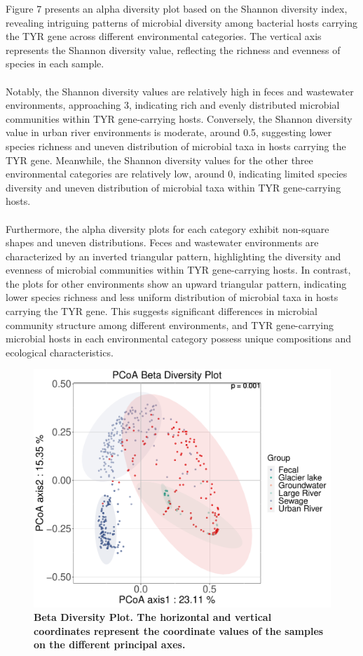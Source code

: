 \documentclass[12pt]{article}
\begin{document}
Figure 7 presents an alpha diversity plot based on the Shannon diversity index, revealing intriguing patterns of microbial diversity among bacterial hosts carrying the TYR gene across different environmental categories. The vertical axis represents the Shannon diversity value, reflecting the richness and evenness of species in each sample.\\\\
Notably, the Shannon diversity values are relatively high in feces and wastewater environments, approaching 3, indicating rich and evenly distributed microbial communities within TYR gene-carrying hosts. Conversely, the Shannon diversity value in urban river environments is moderate, around 0.5, suggesting lower species richness and uneven distribution of microbial taxa in hosts carrying the TYR gene. Meanwhile, the Shannon diversity values for the other three environmental categories are relatively low, around 0, indicating limited species diversity and uneven distribution of microbial taxa within TYR gene-carrying hosts.\\\\
Furthermore, the alpha diversity plots for each category exhibit non-square shapes and uneven distributions. Feces and wastewater environments are characterized by an inverted triangular pattern, highlighting the diversity and evenness of microbial communities within TYR gene-carrying hosts. In contrast, the plots for other environments show an upward triangular pattern, indicating lower species richness and less uniform distribution of microbial taxa in hosts carrying the TYR gene. This suggests significant differences in microbial community structure among different environments, and TYR gene-carrying microbial hosts in each environmental category possess unique compositions and ecological characteristics.
\begin{figure}[H]
    \centering
     \includegraphics[width=1\linewidth]{pic/beta.pdf} 
      \caption{\small\bfseries Beta Diversity Plot. The horizontal and vertical coordinates represent the coordinate values of the samples on the different principal axes.}
\end{figure}
\end{document}
